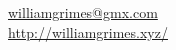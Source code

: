 \documentclass[margin,line]{resume}
\begin{document}
{
    \hfill ~~~~~~~~~~~~~~~~~~~~~~~~~~~~~~~~~~~~~~~~~~~~~~~~~~~~~~~~~~~~~~~~~~~~~~~~~~\ \vspace{0mm}\\\vspace{0mm}%
    \hfill \href{mailto:williamgrimes@gmx.com}{williamgrimes@gmx.com} \ \Letter        \vspace{0mm}\\\vspace{0mm}%
    \hfill \url{http://williamgrimes.xyz/}                        \ \ComputerMouse \vspace{0mm}\\\vspace{-10mm}%
}
\end{document}
